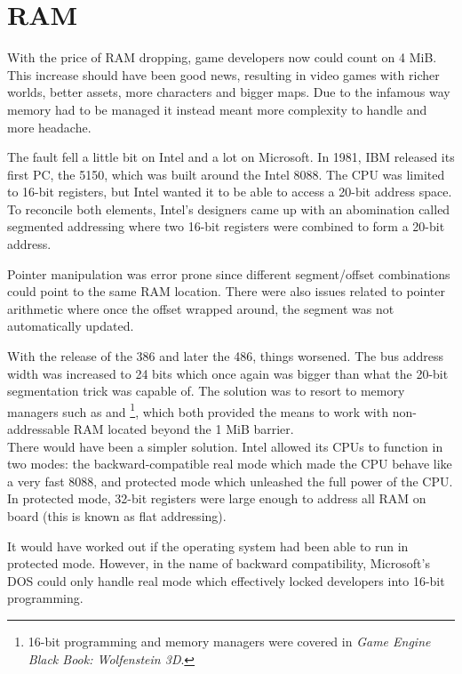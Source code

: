 \section{RAM}
With the price of RAM dropping, game developers now could count on 4 MiB. This increase should have been good news, resulting in video games with richer worlds, better assets, more characters and bigger maps. Due to the infamous way memory had to be managed it instead meant more complexity to handle and more headache.\\
\par
The fault fell a little bit on Intel and a lot on Microsoft. In 1981, IBM released its first PC, the 5150, which was built around the Intel 8088. The CPU was limited to 16-bit registers, but Intel wanted it to be able to access a 20-bit address space. To reconcile both elements, Intel's designers came up with an abomination called segmented addressing where two 16-bit registers were combined to form a 20-bit address.\\
\par


\par
Pointer manipulation was error prone since different segment/offset combinations could point to the same RAM location. There were also issues related to pointer arithmetic where once the offset wrapped around, the segment was not automatically updated.\\
\par
With the release of the 386 and later the 486, things worsened. The bus address width was increased to 24 bits which once again was bigger than what the 20-bit segmentation trick was capable of. The solution was to resort to memory managers such as  and \footnote{16-bit programming and memory managers were covered in \textit{Game Engine Black Book: Wolfenstein 3D}.}, which both provided the means to work with non-addressable RAM located beyond the 1 MiB barrier.\\

There would have been a simpler solution. Intel allowed its CPUs to function in two modes: the backward-compatible real mode which made the CPU behave like a very fast 8088, and protected mode which unleashed the full power of the CPU. In protected mode, 32-bit registers were large enough to address all RAM on board (this is known as flat addressing).\\
\par
It would have worked out if the operating system had been able to run in protected mode. However, in the name of backward compatibility, Microsoft's DOS could only handle real mode which effectively locked developers into 16-bit programming.\\ 
\par




